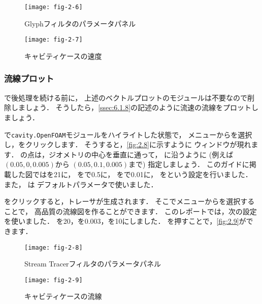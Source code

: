 \begin{figure}[ht]
 \texttt{[image: fig-2-6]}
 \caption{Glyphフィルタのパラメータパネル}
 \label{fig:2.6}
\end{figure}


\begin{figure}[ht]
 \texttt{[image: fig-2-7]}
 \caption{キャビティケースの速度}
 \label{fig:2.7}
\end{figure}


\subsubsection{流線プロット}
\label{sssec:2.1.4.3}
で後処理を続ける前に，
上述のベクトルプロットのモジュールは不要なので削除しましょう．
そうしたら，\autoref{ssec:6.1.8}の記述のように流速の流線をプロットしましょう．

で\texttt{cavity.OpenFOAM}モジュールをハイライトした状態で，
メニューからを選択し，をクリックします．
そうすると，\autoref{fig:2.8}に示すように
ウィンドウが現れます．
の点は，ジオメトリの中心を垂直に通って，
に沿うように (例えば$(0.05, 0, 0.005)$から
$(0.05, 0.1, 0.005)$まで) 指定しましょう．
このガイドに掲載した図ではを21に，
をで0.5に，
をで0.01に，
をという設定を行いました．
また， は
デフォルトパラメータで使いました．

をクリックすると，トレーサが生成されます．
そこでメニューからを選択することで，
高品質の流線図を作ることができます．
このレポートでは，次の設定を使いました．
を20，を0.003，を10にしました．
を押すことで，\autoref{fig:2.9}ができます．


\begin{figure}[ht]
 \texttt{[image: fig-2-8]}
 \caption{Stream Tracerフィルタのパラメータパネル}
 \label{fig:2.8}
\end{figure}


\begin{figure}[ht]
 \texttt{[image: fig-2-9]}
 \caption{キャビティケースの流線}
 \label{fig:2.9}
\end{figure}


